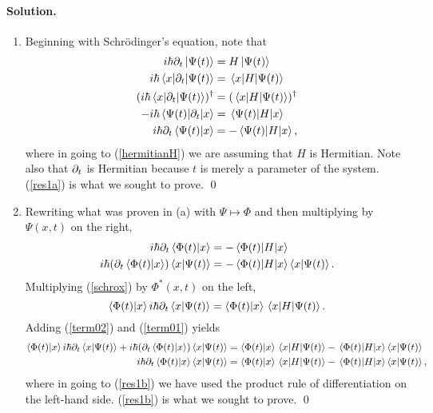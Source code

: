 \documentclass[10pt]{article}
\newcommand{\refeq}[1]{(\ref{#1})}
\newenvironment{solution}
{
    \paragraph{Solution.}
    \ignorespaces
}
{
    \bigskip
}
\newcommand{\Schrodinger}{Schr\"{o}dinger}
\begin{document}
\begin{solution}
	\renewcommand{\theenumi}{\alph{enumi}}
	\begin{enumerate} \label{a}
		\item Beginning with \Schrodinger's equation, note that
			\begin{align}
				i \hbar \partial_t \ket{\Psi(t)} &= H \ket{\Psi(t)} \\
				i \hbar \mel{x}{\partial_t}{\Psi(t)} &= \mel{x}{H}{\Psi(t)} \label{schrox} \\
				(i \hbar \mel{x}{\partial_t}{\Psi(t)})^\dagger &= (\mel{x}{H}{\Psi(t)})^\dagger \\
				-i \hbar \mel{\Psi(t)}{\partial_t}{x} &= \mel{\Psi(t)}{H}{x} \label{hermitianH} \\
				i \hbar \partial_t \braket{\Psi(t)}{x} &= -\mel{\Psi(t)}{H}{x}, \label{res1a}
			\end{align}
			where in going to \refeq{hermitianH} we are assuming that $H$ is Hermitian.  Note also that $\partial_t$ is Hermitian because $t$ is merely a parameter of the system.  \refeq{res1a} is what we sought to prove. \qed
			
		\item Rewriting what was proven in (a) with $\Psi \mapsto \Phi$ and then multiplying by $\Psi(x, t)$ on the right,
			\begin{align}
				i \hbar \partial_t \braket{\Phi(t)}{x} &= -\mel{\Phi(t)}{H}{x} \\
				i \hbar (\partial_t \braket{\Phi(t)}{x}) \braket{x}{\Psi(t)} &= -\mel{\Phi(t)}{H}{x} \braket{x}{\Psi(t)}. \label{term01}
			\end{align}
			Multiplying \refeq{schrox} by $\Phi^*(x, t)$ on the left,
			\begin{equation}
				\braket{\Phi(t)}{x} i \hbar \partial_t \braket{x}{\Psi(t)} = \braket{\Phi(t)}{x} \mel{x}{H}{\Psi(t)}. \label{term02}
			\end{equation}
			Adding \refeq{term02} and \refeq{term01} yields
			\begin{align}
				\braket{\Phi(t)}{x} i \hbar \partial_t \braket{x}{\Psi(t)} + i \hbar (\partial_t \braket{\Phi(t)}{x}) \braket{x}{\Psi(t)} &= \braket{\Phi(t)}{x} \mel{x}{H}{\Psi(t)} - \mel{\Phi(t)}{H}{x} \braket{x}{\Psi(t)} \\
				i \hbar \partial_t \braket{\Phi(t)}{x} \braket{x}{\Psi(t)} &= \braket{\Phi(t)}{x} \mel{x}{H}{\Psi(t)} - \mel{\Phi(t)}{H}{x} \braket{x}{\Psi(t)}, \label{res1b}
			\end{align}
			where in going to \refeq{res1b} we have used the product rule of differentiation on the left-hand side.   \refeq{res1b} is what we sought to prove. \qed
			

\end{enumerate}
\end{solution}
\end{document}
